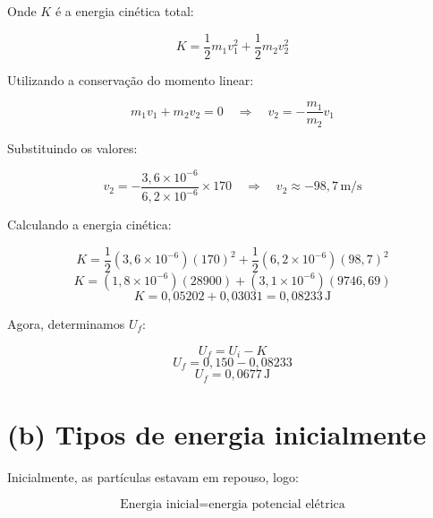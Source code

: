 \documentclass[a4paper,12pt]{article}
\begin{document}
\begin{flushleft}
Onde \( K \) é a energia cinética total:

\begin{equation}
K = \frac{1}{2} m_1 v_1^2 + \frac{1}{2} m_2 v_2^2
\end{equation}

Utilizando a conservação do momento linear:

\begin{equation}
m_1 v_1 + m_2 v_2 = 0
\quad \Rightarrow \quad
v_2 = -\frac{m_1}{m_2} v_1
\end{equation}

Substituindo os valores:

\begin{equation}
v_2 = -\frac{3{,}6 \times 10^{-6}}{6{,}2 \times 10^{-6}} \times 170
\quad \Rightarrow \quad
v_2 \approx -98{,}7 \, \text{m/s}
\end{equation}

Calculando a energia cinética:

\begin{equation}
K = \frac{1}{2} (3{,}6 \times 10^{-6}) (170)^2 + \frac{1}{2} (6{,}2 \times 10^{-6}) (98{,}7)^2
\end{equation}
\begin{equation}
K = (1{,}8 \times 10^{-6})(28900) + (3{,}1 \times 10^{-6})(9746{,}69)
\end{equation}
\begin{equation}
K = 0{,}05202 + 0{,}03031 = 0{,}08233 \, \text{J}
\end{equation}

Agora, determinamos \( U_f \):

\begin{equation}
U_f = U_i - K
\end{equation}
\begin{equation}
U_f = 0{,}150 - 0{,}08233
\end{equation}
\begin{equation}
\boxed{U_f = 0{,}0677 \, \text{J}}
\end{equation}

\section*{(b) Tipos de energia inicialmente}

Inicialmente, as partículas estavam em repouso, logo:

\begin{equation}
\text{Energia inicial} = \text{energia potencial elétrica}
\end{equation}


\end{flushleft}
\end{document}
